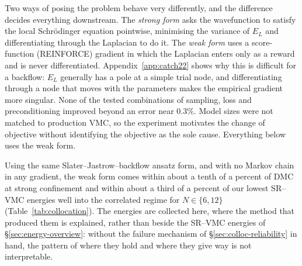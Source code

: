Two ways of posing the problem behave very differently, and the difference decides
everything downstream. The \emph{strong form} asks the wavefunction to satisfy the local
Schr\"odinger equation pointwise, minimising the variance of $E_L$ and differentiating
through the Laplacian to do it. The \emph{weak form} uses a score-function (REINFORCE)
gradient in which the Laplacian enters only as a reward and is never differentiated.
Appendix~\ref{app:catch22} shows why this is difficult for a backflow: $E_L$ generally has a
pole at a simple trial node, and differentiating through a node that moves with the
parameters makes the empirical gradient more singular. None of the tested combinations of
sampling, loss and preconditioning improved beyond an error near $0.3\%$. Model sizes were
not matched to production VMC, so the experiment motivates the change of objective without
identifying the objective as the sole cause. Everything below uses the weak form.

Using the same Slater--Jastrow--backflow ansatz form, and with no
Markov chain in any gradient, the weak form comes within about a tenth of a percent of DMC
at strong confinement and within about a third of a percent of our lowest SR--VMC energies
well into the correlated regime for $N\in\{6,12\}$ (Table~\ref{tab:collocation}). The energies are collected here, where the method that
produced them is explained, rather than beside the SR--VMC energies of
\S\ref{sec:energy-overview}: without the failure mechanism of
\S\ref{sec:colloc-reliability} in hand, the pattern of where they hold and where they give
way is not interpretable.

